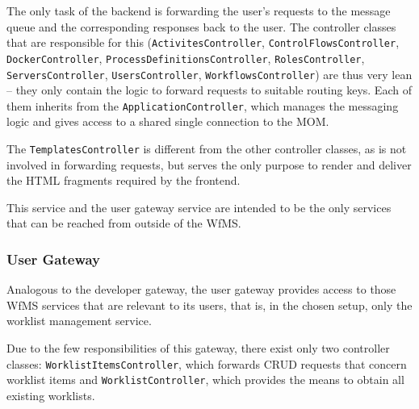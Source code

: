     The only task of the backend is forwarding the user's requests to the message queue and the corresponding responses back to the user. The controller classes that are responsible for this (\texttt{ActivitesController}, \texttt{ControlFlowsController}, \texttt{DockerController}, \texttt{ProcessDefinitionsController}, \texttt{RolesController}, \texttt{ServersController}, \texttt{UsersController}, \texttt{WorkflowsController}) are thus very lean -- they only contain the logic to forward requests to suitable routing keys. Each of them inherits from the \texttt{ApplicationController}, which manages the messaging logic and gives access to a shared single connection to the \ac{MOM}.

    The \texttt{TemplatesController} is different from the other controller classes, as is not involved in forwarding requests, but serves the only purpose to render and deliver the \ac{HTML} fragments required by the frontend.

    This service and the user gateway service are intended to be the only services that can be reached from outside of the \ac{WfMS}.


  \subsubsection{User Gateway} %
    \label{subs:user_gateway}
    Analogous to the developer gateway, the user gateway provides access to those \ac{WfMS} services that are relevant to its users, that is, in the chosen setup, only the worklist management service.

    Due to the few responsibilities of this gateway, there exist only two controller classes: \texttt{WorklistItemsController}, which forwards \ac{CRUD} requests that concern worklist items and \texttt{WorklistController}, which provides the means to obtain all existing worklists.



